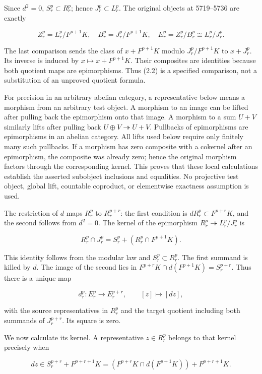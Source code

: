 Since \(d^2=0\), \(S_r^p\subset R_r^p\); hence \(J_r^p\subset L_r^p\). The original objects at 5719--5736 are exactly

\[
Z_r^p=L_r^p/F^{p+1}K,\quad B_r^p=J_r^p/F^{p+1}K,\quad
E_r^p=Z_r^p/B_r^p\cong L_r^p/J_r^p.       \tag{2.2}
\]

The last comparison sends the class of \(x+F^{p+1}K\) modulo \(J_r^p/F^{p+1}K\) to \(x+J_r^p\). Its inverse is induced by \(x\mapsto x+F^{p+1}K\). Their composites are identities because both quotient maps are epimorphisms. Thus (2.2) is a specified comparison, not a substitution of an unproved quotient formula.

For precision in an arbitrary abelian category, a representative below means a morphism from an arbitrary test object. A morphism to an image can be lifted after pulling back the epimorphism onto that image. A morphism to a sum \(U+V\) similarly lifts after pulling back \(U\oplus V\twoheadrightarrow U+V\). Pullbacks of epimorphisms are epimorphisms in an abelian category. All lifts used below require only finitely many such pullbacks. If a morphism has zero composite with a cokernel after an epimorphism, the composite was already zero; hence the original morphism factors through the corresponding kernel. This proves that these local calculations establish the asserted subobject inclusions and equalities. No projective test object, global lift, countable coproduct, or elementwise exactness assumption is used.

The restriction of \(d\) maps \(R_r^p\) to \(R_r^{p+r}\): the first condition is \(dR_r^p\subset F^{p+r}K\), and the second follows from \(d^2=0\). The kernel of the epimorphism \(R_r^p\twoheadrightarrow L_r^p/J_r^p\) is

\[
R_r^p\cap J_r^p=S_r^p+(R_r^p\cap F^{p+1}K).       \tag{2.3}
\]

This identity follows from the modular law and \(S_r^p\subset R_r^p\). The first summand is killed by \(d\). The image of the second lies in \(F^{p+r}K\cap d(F^{p+1}K)=S_r^{p+r}\). Thus there is a unique map

\[
d_r^p:E_r^p\longrightarrow E_r^{p+r},\qquad
[z]\longmapsto[dz],                     \tag{2.4}
\]

with the source representatives in \(R_r^p\) and the target quotient including both summands of \(J_r^{p+r}\). Its square is zero.

We now calculate its kernel. A representative \(z\in R_r^p\) belongs to that kernel precisely when

\[
dz\in S_r^{p+r}+F^{p+r+1}K
=(F^{p+r}K\cap d(F^{p+1}K))+F^{p+r+1}K.
\]

